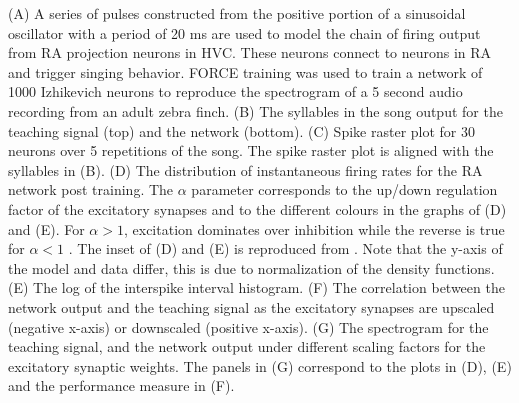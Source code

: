 \documentclass[11pt]{article} %
\begin{document}
(A) A series of pulses constructed from the positive portion of a sinusoidal oscillator with a period of 20 ms are used to model the chain of firing output from RA projection neurons in HVC.  These neurons connect to neurons in RA and trigger singing behavior.   FORCE training was used to train a network of 1000 Izhikevich neurons to reproduce the spectrogram of a 5 second audio recording from an adult zebra finch.  (B) The syllables in the song output for the teaching signal (top) and the network (bottom). (C) Spike raster plot for 30 neurons over 5 repetitions of the song.  The spike raster plot is aligned with the syllables in (B).  (D) The distribution of instantaneous firing rates for the RA network post training.  The $\alpha$ parameter corresponds to the up/down regulation factor of the excitatory synapses and to the different colours in the graphs of (D) and (E).  For $\alpha > 1$, excitation dominates over inhibition while the reverse is true for $\alpha < 1$ .    The inset of (D) and (E) is reproduced from \cite{Fee2}.  Note that the y-axis of the model and data differ, this is due to normalization of the density functions.    (E) The log of the interspike interval histogram.  (F) The correlation between the network output and the teaching signal as the excitatory synapses are upscaled (negative x-axis) or downscaled (positive x-axis).    (G) The spectrogram for the teaching signal, and the network output under different scaling factors for the excitatory synaptic weights.   The panels in (G) correspond to the plots in (D), (E) and the performance measure in (F).  
\end{document}
